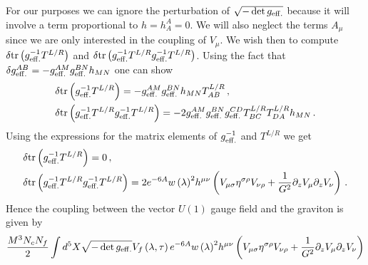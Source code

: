 \documentclass[a4paper,12pt]{article}
\begin{document}
 For our purposes we can ignore the perturbation of $\sqrt{-\det g_{\rm{eff.}}}$ because it will involve a term proportional to $h = h^A_A = 0$. We will also neglect the terms $A_{\mu}$ since we are only interested in the coupling of $V_\mu$. We wish then to compute $\delta \text{tr} \left( g^{-1}_{\rm{eff.}} T^{L/R}\right)$ and $\delta \text{tr} \left( g^{-1}_{\rm{eff.}} T^{L/R} g^{-1}_{\rm{eff.}} T^{L/R} \right)$. Using the fact that $\delta g^{AB}_{\rm{eff.}} = - g_{\rm{eff.}}^{AM} g_{\rm{eff.}}^{BN} h_{MN}$ one can show
\begin{align}
&\delta \text{tr} \left( g^{-1}_{\rm{eff.}} T^{L/R}\right) = -  g_{\rm{eff.}}^{AM} g_{\rm{eff.}}^{BN} h_{MN} T^{L/R}_{AB}\, , \\
&\delta \text{tr} \left( g^{-1}_{\rm{eff.}} T^{L/R} g^{-1}_{\rm{eff.}} T^{L/R} \right) = - 2 g^{AM}_{\rm{eff.}} g^{BN}_{\rm{eff.}} g^{CD}_{\rm{eff.}} T^{L/R}_{BC} T^{L/R}_{DA} h_{MN}\, .
\end{align}
Using the expressions for the matrix elements of $g^{-1}_{\rm{eff.}}$ and $T^{L/R}$ we get
\begin{align}
&\delta \text{tr} \left( g^{-1}_{\rm{eff.}} T^{L/R}\right) = 0 \, , \\
& \delta \text{tr} \left( g^{-1}_{\rm{eff.}} T^{L/R} g^{-1}_{\rm{eff.}} T^{L/R} \right)  = 2 e^{-6A} {w\left( \lambda \right)}^2 h^{\mu \nu} \left( V_{\mu \sigma} \eta^{\sigma \rho} V_{\nu \rho} + \frac{1}{G^2} \partial_z V_\mu \partial_z V_\nu \right) \, .
\end{align}
Hence the coupling between the vector $U(1)$ gauge field and the graviton is given by
\begin{align}
\frac{M^3 N_c N_f}{2}  \int d^5 X \sqrt{-\det g_{\rm{eff.}}} V_{f} \left(\lambda, \tau \right) e^{-6 A} {w\left(\lambda\right)}^2 h^{\mu \nu} \left( V_{\mu \sigma} \eta^{\sigma \rho} V_{\nu \rho} + \frac{1}{G^2} \partial_z V_\mu \partial_z V_\nu \right)
\end{align}
\end{document}

